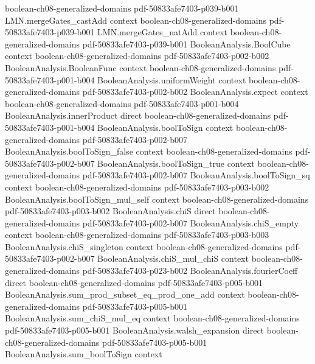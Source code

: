 \begin{theorem}
  {boolean-ch08-generalized-domains}
  {pdf-50833afe7403-p039-b001}
\proofstep
  {LMN.mergeGates_castAdd}
  {context}
  {boolean-ch08-generalized-domains}
  {pdf-50833afe7403-p039-b001}
\proofstep
  {LMN.mergeGates_natAdd}
  {context}
  {boolean-ch08-generalized-domains}
  {pdf-50833afe7403-p039-b001}
\proofstep
  {BooleanAnalysis.BoolCube}
  {context}
  {boolean-ch08-generalized-domains}
  {pdf-50833afe7403-p002-b002}
\proofstep
  {BooleanAnalysis.BooleanFunc}
  {context}
  {boolean-ch08-generalized-domains}
  {pdf-50833afe7403-p001-b004}
\proofstep
  {BooleanAnalysis.uniformWeight}
  {context}
  {boolean-ch08-generalized-domains}
  {pdf-50833afe7403-p002-b002}
\proofstep
  {BooleanAnalysis.expect}
  {context}
  {boolean-ch08-generalized-domains}
  {pdf-50833afe7403-p001-b004}
\proofstep
  {BooleanAnalysis.innerProduct}
  {direct}
  {boolean-ch08-generalized-domains}
  {pdf-50833afe7403-p001-b004}
\proofstep
  {BooleanAnalysis.boolToSign}
  {context}
  {boolean-ch08-generalized-domains}
  {pdf-50833afe7403-p002-b007}
\proofstep
  {BooleanAnalysis.boolToSign_false}
  {context}
  {boolean-ch08-generalized-domains}
  {pdf-50833afe7403-p002-b007}
\proofstep
  {BooleanAnalysis.boolToSign_true}
  {context}
  {boolean-ch08-generalized-domains}
  {pdf-50833afe7403-p002-b007}
\proofstep
  {BooleanAnalysis.boolToSign_sq}
  {context}
  {boolean-ch08-generalized-domains}
  {pdf-50833afe7403-p003-b002}
\proofstep
  {BooleanAnalysis.boolToSign_mul_self}
  {context}
  {boolean-ch08-generalized-domains}
  {pdf-50833afe7403-p003-b002}
\proofstep
  {BooleanAnalysis.chiS}
  {direct}
  {boolean-ch08-generalized-domains}
  {pdf-50833afe7403-p002-b007}
\proofstep
  {BooleanAnalysis.chiS_empty}
  {context}
  {boolean-ch08-generalized-domains}
  {pdf-50833afe7403-p003-b003}
\proofstep
  {BooleanAnalysis.chiS_singleton}
  {context}
  {boolean-ch08-generalized-domains}
  {pdf-50833afe7403-p002-b007}
\proofstep
  {BooleanAnalysis.chiS_mul_chiS}
  {context}
  {boolean-ch08-generalized-domains}
  {pdf-50833afe7403-p023-b002}
\proofstep
  {BooleanAnalysis.fourierCoeff}
  {direct}
  {boolean-ch08-generalized-domains}
  {pdf-50833afe7403-p005-b001}
\proofstep
  {BooleanAnalysis.sum_prod_subset_eq_prod_one_add}
  {context}
  {boolean-ch08-generalized-domains}
  {pdf-50833afe7403-p005-b001}
\proofstep
  {BooleanAnalysis.sum_chiS_mul_eq}
  {context}
  {boolean-ch08-generalized-domains}
  {pdf-50833afe7403-p005-b001}
\proofstep
  {BooleanAnalysis.walsh_expansion}
  {direct}
  {boolean-ch08-generalized-domains}
  {pdf-50833afe7403-p005-b001}
\proofstep
  {BooleanAnalysis.sum_boolToSign}
  {context}

\end{theorem}
